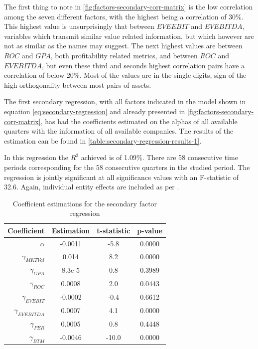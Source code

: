 The first thing to note in \autoref{fig:factors-secondary-corr-matrix} is the low correlation among the seven different factors, with the highest being a correlation of 30\%. This highest value is unsurprisingly that between $EVEEBIT$ and $EVEBITDA$, variables which transmit similar value related information, but which however are not as similar as the names may suggest. The next highest values are between $ROC$ and $GPA$, both profitability related metrics, and between $ROC$ and $EVEBITDA$, but even these third and seconds highest correlation pairs have a correlation of below 20\%. Most of the values are in the single digits, sign of the high orthogonality between most pairs of assets. 

The first secondary regression, with all factors indicated in the model shown in equation \eqref{eq:secondary-regression} and already presented in \autoref{fig:factors-secondary-corr-matrix}, has had the coefficients estimated on the alphas of all available quarters with the information of all available companies. The results of the estimation can be found in \autoref{table:secondary-regression-results-1}.

In this regression the $R^2$ achieved is of 1.09\%. There are 58 consecutive time periods corresponding for the 58 consecutive quarters in the studied period. The regression is jointly significant at all significance values with an F-statistic of 32.6. Again, individual entity effects are included as per \cite{ian_wagner_2019}. 
\newpage
\begin{table}[ht]
    \centering
    \begin{tabular}{rccc}
        \toprule
        Coefficient & Estimation & t-statistic & p-value \\ 
        \midrule
        $\alpha$ & -0.0011 & -5.8 & 0.0000 \\
        $\gamma_{MKTVal}$ & 0.014 & 8.2 & 0.0000 \\
        $\gamma_{GPA}$ & 8.3e-5 & 0.8 & 0.3989 \\
        $\gamma_{ROC}$ & 0.0008 & 2.0 & 0.0443 \\
        $\gamma_{EVEBIT}$ & -0.0002 & -0.4 & 0.6612 \\
        $\gamma_{EVEBITDA}$ & 0.0007 & 4.1 & 0.0000 \\
        $\gamma_{PER}$ & 0.0005 & 0.8 & 0.4448 \\
        $\gamma_{BTM}$ & -0.0046 & -10.0 & 0.0000 \\
        \bottomrule
    \end{tabular}
    \caption{Coefficient estimations for the secondary factor regression}
    \label{table:secondary-regression-results-1}
\end{table}

